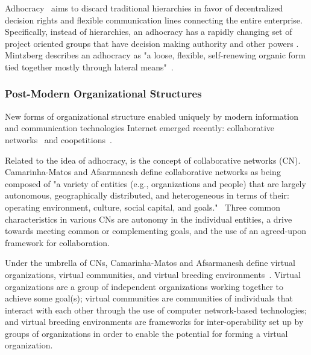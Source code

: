 Adhocracy~\cite{applegate1988,pearlson2009}  aims to discard traditional hierarchies in favor of decentralized decision rights and flexible communication lines connecting the entire enterprise. Specifically, instead of hierarchies, an adhocracy has a rapidly changing set of project oriented groups that have decision making authority and other powers  \cite{robbins1997}. Mintzberg describes an adhocracy as "a loose, flexible, self-renewing organic form tied together mostly through lateral means"~\cite{Mintzberg1979}.  

\subsubsection{Post-Modern Organizational Structures}

New forms of organizational structure enabled uniquely by modern information and communication technologies  Internet emerged recently:  collaborative networks~\cite{Camarinha-Matos2005} and coopetitions~\cite{Bengtsson2000}.


Related to the idea of adhocracy, is the concept of collaborative networks (CN). Camarinha-Matos and Afsarmanesh define collaborative networks as being composed of "a variety of entities (e.g., organizations and people) that are largely autonomous, geographically distributed, and heterogeneous in terms of their: operating environment, culture, social capital, and goals."~\cite{Camarinha-Matos2005} Three common characteristics in various CNs are autonomy in the individual entities, a drive towards meeting common or complementing goals, and the use of an agreed-upon framework for collaboration. 

Under the umbrella of CNs, Camarinha-Matos and Afsarmanesh define virtual organizations, virtual communities, and virtual breeding environments~\cite{Camarinha-Matos2005}. Virtual organizations are a group of independent organizations working together to achieve some goal(s); virtual communities are communities of individuals that interact with each other through the use of computer network-based technologies; and virtual breeding environments are frameworks for inter-operability set up by groups of organizations in order to enable the potential for forming a virtual organization.


